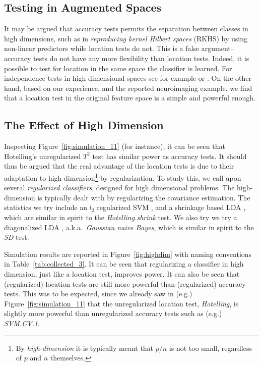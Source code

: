 \documentclass[12pt,a4paper]{article}
\begin{document}
\subsection{Testing in Augmented Spaces}
It may be argued that accuracy tests permits the separation between classes in high dimensions, such as in \emph{reproducing kernel Hilbert spaces} (RKHS) by using non-linear predictors while location tests do not. 
This is a false argument-- accuracy tests do not have any more flexibility than location tests. 
Indeed, it is possible to test for location in the same space the classifier is learned. 
For independence tests in high dimensional spaces see for example \cite{szekely_brownian_2009} or \citet{gretton_kernel_2012-1}.
On the other hand, based on our experience, and the reported neuroimaging example, we find that a location test in the original feature space is a simple and powerful enough.










\subsection{The Effect of High Dimension}
\label{sec:highdim}
Inspecting Figure~\ref{fig:simulation_11} (for instance), it can be seen that Hotelling's unregularized  $T^2$ test has similar power as accuracy tests. 
It should thus be argued that the real advantage of the location tests is due to their adaptation to high dimension\footnote{By \emph{high-dimension} it is typically meant that $p/n$ is not too small, regardless of $p$ and $n$ themselves. } by regularization.
To study this, we call upon several \emph{regularized classifiers}, designed for high dimensional problems. 
The high-dimension is typically dealt with by regularizing the covariance estimation. 
The statistics we try include an $l_2$ regularized SVM \citep{friedman_regularization_2010}, and a shrinkage based LDA \citep{pang_shrinkage-based_2009,ramey_high-dimensional_2016}, which are similar in spirit to the \emph{Hotelling.shrink} test. 
We also try we try a diagonalized LDA \citep{dudoit_comparison_2002}, a.k.a.\ \emph{Gaussian naive Bayes}, which is similar in spirit to the \emph{SD} test. 


Simulation results are reported in Figure~\ref{fig:highdim} with naming conventions in Table~\ref{tab:collected_3}.
It can be seen that regularizing a classifier in high dimension, just like a location test, improves power. 
It can also be seen that (regularized) location tests are still more powerful than (regularized) accuracy tests. 
This was to be expected, since we already saw in (e.g.) Figure~\ref{fig:simulation_11} that the unregularized location test, \emph{Hotelling}, is slightly more powerful than unregularized accuracy tests such as (e.g.) \emph{SVM.CV.1}.
\end{document}
